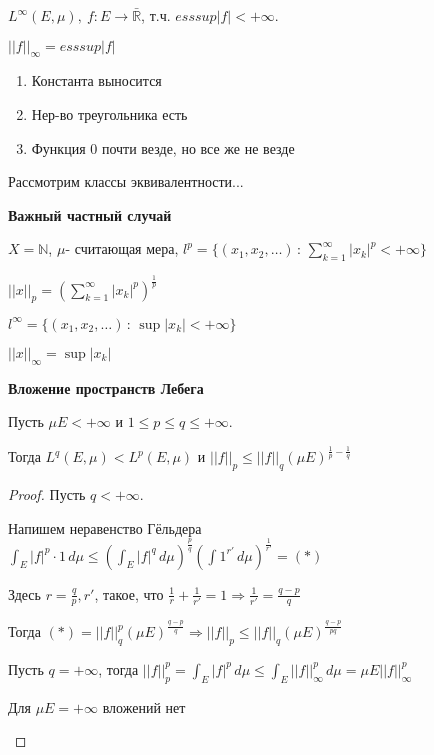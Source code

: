 \begin{definition}
    $L^{\infty} (E, \mu), \ f: E \rightarrow \bar{\mathbb{R}}$, т.ч. $esssup |f| < +\infty$.

    $|| f ||_{\infty} = esssup |f|$

    \begin{enumerate}
        \item Константа выносится
        \item Нер-во треугольника есть
        \item Функция 0 почти везде, но все же не везде
    \end{enumerate}

    Рассмотрим классы эквивалентности...

    \textbf{Важный частный случай}

    $X = \mathbb{N}$, $\mu$- считающая мера, $l^p = \{ (x_1, x_2, \ldots) \, : \, \sum_{k = 1}^{\infty} |x_k|^p < +\infty \}$

    $|| x ||_p = \left( \sum_{k = 1}^{\infty} |x_k|^p \right)^{\frac{1}{p}}$

    $l^\infty = \{ (x_1, x_2, \ldots) \, : \, \sup |x_k| < +\infty \}$

    $|| x ||_{\infty} = \sup |x_k|$    
\end{definition}

\begin{theorem}
    \textbf{Вложение пространств Лебега}

    Пусть $\mu E < +\infty$ и $1 \leqslant p \leqslant q \leqslant +\infty$.

    Тогда $L^q (E, \mu) < L^p (E, \mu)$ и $||f||_p \leqslant ||f||_q (\mu E)^{\frac{1}{p}-\frac{1}{q}}$
\end{theorem}

\begin{proof}
    Пусть $q < +\infty$. 
    
    Напишем неравенство Гёльдера $\int_E |f|^p \cdot 1 \, d\mu \leqslant \left( \int_E |f|^q \, d\mu \right)^{\frac{p}{q}} \left( \int 1^{r'} \, d\mu \right)^{\frac{1}{r'}} = (*)$

    Здесь $r = \frac{q}{p}, r'$, такое, что $\frac{1}{r} + \frac{1}{r'} = 1 \Rightarrow \frac{1}{r'} = \frac{q - p}{q}$ 

    Тогда $(*) = ||f||_q^p (\mu E)^{\frac{q - p}{q}} \Rightarrow ||f||_p \leqslant ||f||_q (\mu E)^{\frac{q - p}{pq}}$

    Пусть $q = +\infty$, тогда $||f||_p^p = \int_E |f|^p \, d\mu \leqslant \int_E ||f||_\infty^p \, d\mu = \mu E ||f||_\infty^p$

    \begin{remark}
        Для $\mu E = +\infty$ вложений нет
    \end{remark}
\end{proof}

